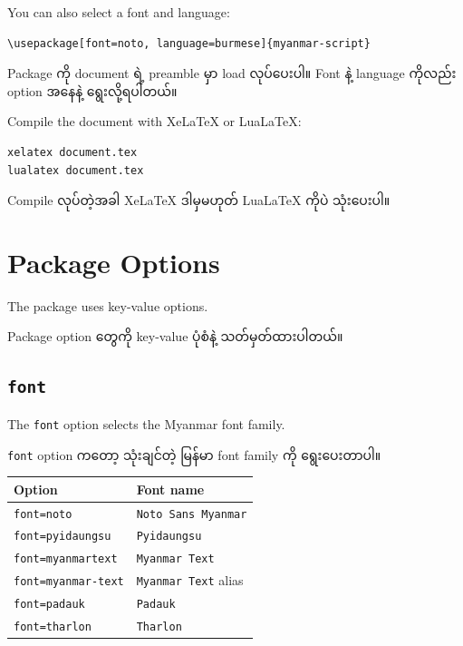 \documentclass[a4paper,11pt]{article}
\newcommand{\opt}[1]{\texttt{#1}}
\newenvironment{burmese}
  {\par\smallskip\begin{myanmar}\sloppy}
  {\par\end{myanmar}\fussy\smallskip}
\begin{document}
You can also select a font and language:

\begin{Verbatim}
\usepackage[font=noto, language=burmese]{myanmar-script}
\end{Verbatim}

\begin{burmese}
Package ကို document ရဲ့ preamble မှာ load လုပ်ပေးပါ။ Font နဲ့ language ကိုလည်း 
option အနေနဲ့ ရွေးလို့ရပါတယ်။
\end{burmese}

Compile the document with XeLaTeX or LuaLaTeX:

\begin{Verbatim}
xelatex document.tex
lualatex document.tex
\end{Verbatim}

\begin{burmese}
Compile လုပ်တဲ့အခါ XeLaTeX ဒါမှမဟုတ် LuaLaTeX ကိုပဲ သုံးပေးပါ။
\end{burmese}

\section{Package Options}

The package uses key-value options.

\begin{burmese}
Package option တွေကို key-value ပုံစံနဲ့ သတ်မှတ်ထားပါတယ်။
\end{burmese}

\subsection{\opt{font}}

The \opt{font} option selects the Myanmar font family.

\begin{burmese}
\opt{font} option ကတော့ သုံးချင်တဲ့ မြန်မာ font family ကို ရွေးပေးတာပါ။
\end{burmese}

\begin{center}
\begin{tabular}{ll}
\toprule
Option & Font name \\
\midrule
\opt{font=noto} & \texttt{Noto Sans Myanmar} \\
\opt{font=pyidaungsu} & \texttt{Pyidaungsu} \\
\opt{font=myanmartext} & \texttt{Myanmar Text} \\
\opt{font=myanmar-text} & \texttt{Myanmar Text} alias \\
\opt{font=padauk} & \texttt{Padauk} \\
\opt{font=tharlon} & \texttt{Tharlon} \\
\bottomrule
\end{tabular}
\end{center}
\end{document}
